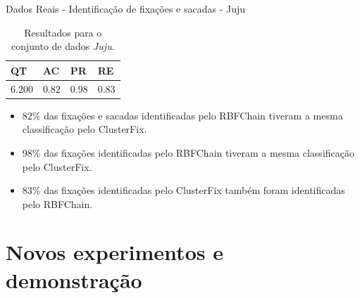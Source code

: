 \documentclass[10pt]{beamer}
\begin{document}
\begin{frame}{Dados Reais - Identificação de fixações e sacadas -  Juju}
    \begin{table}[ht!]
        \centering
        \caption{Resultados para o conjunto de dados \textit{Juju}.}
        \label{tbl:juju}
        \begin{tabular}{llll}

        \toprule
        QT              & AC                     & PR                     & RE      \\
        \midrule
        $6.200$         & $0.82$                 & $0.98$                 & $0.83$      \\
        \bottomrule

        \end{tabular}
    \end{table}

    \begin{itemize}
        \item \alert{$82\%$} das fixações e sacadas identificadas pelo RBFChain tiveram a mesma classificação pelo ClusterFix.
        \item \alert{$98\%$} das fixações identificadas pelo RBFChain tiveram a mesma classificação pelo ClusterFix.
        \item \alert{$83\%$} das fixações identificadas pelo ClusterFix também foram identificadas pelo RBFChain.
    \end{itemize}
\end{frame}

\section{Novos experimentos e demonstração}
\end{document}

